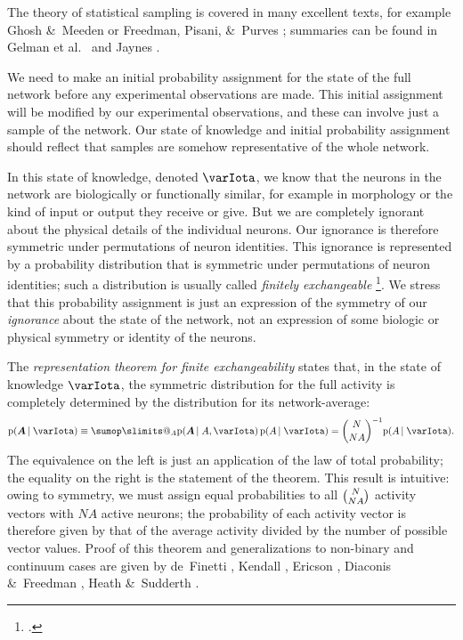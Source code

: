 \documentclass[\ifafour a4paper,12pt,\else a5paper,10pt,\fi%
onecolumn,oneside,article,%
british%
]{memoir}
\makeatletter
\theoremstyle{remark}
\theoremstyle{innote}
\def\sum{\DOTSI\sumop\slimits@}
\newcommand*{\citep}{\footcites}
\newcommand*{\citey}{\parencites*}
\newcommand*{\amp}{\&}
\newcommand*{\pf}{\mathrm{p}}%
\renewcommand*{\|}[1][]{\nonscript\,#1\vert\nonscript\;\mathopen{}}
\newcommand*{\chap}{ch.}%
\newcommand*{\etal}{{et al.}}
\newcommand*{\yAv}{A}
\newcommand*{\yNv}{N}
\newcommand*{\yAA}{\bm{\yAv}}%
\newcommand*{\yA}{\yAv}%
\newcommand*{\yH}{\varIota}
\makeatother
\begin{document}
\bigskip

The theory of statistical sampling is covered in many excellent texts, for
example Ghosh \amp\ Meeden \citey{ghoshetal1997} or Freedman, Pisani, \amp\
Purves \citey[parts~I, VI]{freedmanetal1978_r2007}; summaries can be found
in Gelman \etal\ \citey[\chap~8]{gelmanetal1995_r2014} and Jaynes
\citey[\chap~3]{jaynes1994_r2003}.

We need to make an initial probability assignment for the state of the full
network before any experimental observations are made. This initial
assignment will be modified by our experimental observations, and these can
involve just a sample of the network. Our state of knowledge and initial
probability assignment should reflect that samples are somehow
representative of the whole network.

In this state of knowledge, denoted $\yH$, we know that the neurons in the
network are biologically or functionally similar, for example in
morphology or the kind of input or output they receive or give. But we are
completely ignorant about the physical details of the individual neurons.
Our ignorance is therefore symmetric under permutations of neuron
identities. This ignorance is represented by a probability distribution
that is symmetric under permutations of neuron identities; such a
distribution is usually called \emph{finitely exchangeable}
\citep{ericson1969}[\chap~1]{ghoshetal1997}. We stress that this
probability assignment is just an expression of the symmetry of our
\emph{ignorance} about the state of the network, not an expression of
some biologic or physical symmetry or identity of the neurons.

The \emph{representation theorem for finite exchangeability} states that,
in the state of knowledge $\yH$, the symmetric distribution for the full
activity is completely determined by the distribution for its
network-average:
\begin{equation}
  \label{eq:joint_plaus_N_homog}
  \pf(\yAA \|  \yH) \equiv
  \sum_{\yA}\pf(\yAA \| \yA, \yH)\,
  \pf(\yA \| \yH) =
  \binom{\yNv}{\yNv\yA}^{-1} \pf(\yA \| \yH).
\end{equation}
The equivalence on the left is just an application of the law of total
probability; the equality on the right is the statement of the theorem.
This result is intuitive: owing to symmetry, we must assign equal
probabilities to all $\tbinom{\yNv}{\yNv\yA}$ activity vectors with
$\yNv\yA$ active neurons; the probability of each activity vector is
therefore given by that of the average activity divided by the number of
possible vector values. Proof of this theorem and generalizations to
non-binary and continuum cases are given by de~Finetti
\citey{definetti1959b}, Kendall \citey{kendall1967}, Ericson
\citey{ericson1976}, Diaconis \amp\ Freedman
\citey{diaconis1977,diaconisetal1980}, Heath \amp\ Sudderth
\citey{heathetal1976}.
\end{document}
